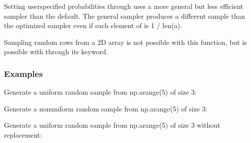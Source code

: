 \documentclass[letterpaper,10pt,english]{sphinxmanual}
\begin{document}
\begin{fulllineitems}
\sphinxAtStartPar
Setting user\sphinxhyphen{}specified probabilities through  uses a more general but less
efficient sampler than the default. The general sampler produces a different sample
than the optimized sampler even if each element of  is 1 / len(a).

\sphinxAtStartPar
Sampling random rows from a 2\sphinxhyphen{}D array is not possible with this function,
but is possible with  through its  keyword.
\subsubsection*{Examples}

\sphinxAtStartPar
Generate a uniform random sample from np.arange(5) of size 3:

\begin{sphinxVerbatim}[commandchars=\\\{\}]
 
\end{sphinxVerbatim}

\sphinxAtStartPar
Generate a non\sphinxhyphen{}uniform random sample from np.arange(5) of size 3:

\begin{sphinxVerbatim}[commandchars=\\\{\}]
  \PYG{p}{[}    \PYG{p}{]}
\end{sphinxVerbatim}

\sphinxAtStartPar
Generate a uniform random sample from np.arange(5) of size 3 without
replacement:

\begin{sphinxVerbatim}[commandchars=\\\{\}]
  
\end{sphinxVerbatim}


\end{fulllineitems}
\end{document}
